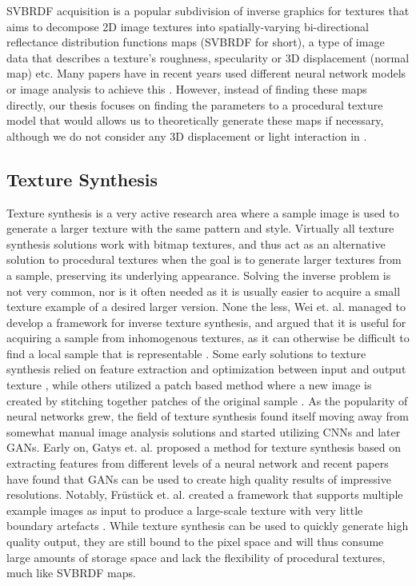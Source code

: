 SVBRDF acquisition is a popular subdivision of inverse graphics for textures that aims to decompose 2D image textures into spatially-varying bi-directional reflectance distribution functions maps (SVBRDF for short), a type of image data that describes a texture's roughness, specularity or 3D displacement (normal map) etc. Many papers have in recent years used different neural network models or image analysis to achieve this \cite{deschaintre_2018_singleimage, kang_2018_efficient, nalbach_2017_deep, aittala_2016_reflectance}. However, instead of finding these maps directly, our thesis focuses on finding the parameters to a procedural texture model that would allows us to theoretically generate these maps if necessary, although we do not consider any 3D displacement or light interaction in \dipter{}.

\subsection{Texture Synthesis}

Texture synthesis is a very active research area where a sample image is used to generate a larger texture with the same pattern and style. Virtually all texture synthesis solutions work with bitmap textures, and thus act as an alternative solution to procedural textures when the goal is to generate larger textures from a sample, preserving its underlying appearance. Solving the inverse problem is not very common, nor is it often needed as it is usually easier to acquire a small texture example of a desired larger version. None the less, Wei et. al. managed to develop a framework for inverse texture synthesis, and argued that it is useful for acquiring a sample from inhomogenous textures, as it can otherwise be difficult to find a local sample that is representable \cite{wei_2008_inverse}. Some early solutions to texture synthesis relied on feature extraction and optimization between input and output texture \cite{kwatra_2005_texture}, while others utilized a patch based method where a new image is created by stitching together patches of the original sample \cite{efrosalexeia_2001_image}. As the popularity of neural networks grew, the field of texture synthesis found itself moving away from somewhat manual image analysis solutions and started utilizing CNNs and later GANs. Early on, Gatys et. al. proposed a method for texture synthesis based on extracting features from different levels of a neural network \cite{gatys_2015_texture} and recent papers have found that GANs can be used to create high quality results of impressive resolutions. Notably, Früstück et. al. created a framework that supports multiple example images as input to produce a large-scale texture with very little boundary artefacts \cite{frhstck_2019_tilegan}. While texture synthesis can be used to quickly generate high quality output, they are still bound to the pixel space and will thus consume large amounts of storage space and lack the flexibility of procedural textures, much like SVBRDF maps.


